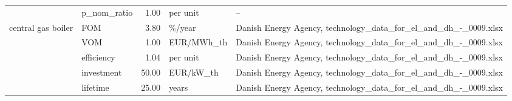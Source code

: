 \begin{longtable}{p{5cm}p{3cm}rp{3cm}p{11cm}}
                      & p\_nom\_ratio &           1.00 &                          per unit &                                                                                                                                                                                                                                                                                                                                   -- \\
central gas boiler & FOM &           3.80 &                            \%/year &                                                                                                                                                                                                                                                                      Danish Energy Agency, technology\_data\_for\_el\_and\_dh\_-\_0009.xlsx \\
                      & VOM &           1.00 &                        EUR/MWh\_th &                                                                                                                                                                                                                                                                      Danish Energy Agency, technology\_data\_for\_el\_and\_dh\_-\_0009.xlsx \\
                      & efficiency &           1.04 &                          per unit &                                                                                                                                                                                                                                                                      Danish Energy Agency, technology\_data\_for\_el\_and\_dh\_-\_0009.xlsx \\
                      & investment &          50.00 &                         EUR/kW\_th &                                                                                                                                                                                                                                                                      Danish Energy Agency, technology\_data\_for\_el\_and\_dh\_-\_0009.xlsx \\
                      & lifetime &          25.00 &                             years &                                                                                                                                                                                                                                                                      Danish Energy Agency, technology\_data\_for\_el\_and\_dh\_-\_0009.xlsx \\

\end{longtable}
